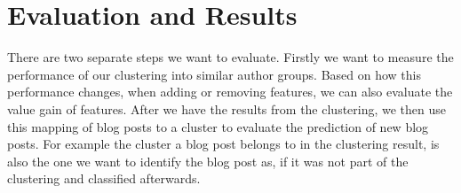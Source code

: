 \section{Evaluation and Results}
\label{sec:results}



There are two separate steps we want to evaluate.
Firstly we want to measure the performance of our clustering into similar author groups.
Based on how this performance changes, when adding or removing features, we can also evaluate the value gain of features.
After we have the results from the clustering, we then use this mapping of blog posts to a cluster to evaluate the prediction of new blog posts.
For example the cluster a blog post belongs to in the clustering result, is also the one we want to identify the blog post as, if it was not part of the clustering and classified afterwards.


